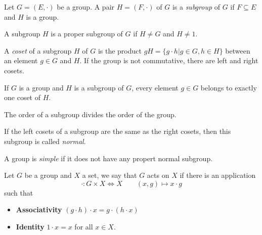 \begin{definition}[Subgroup]
  Let $G = (E, \cdot)$ be a group. A pair $H = (F, \cdot)$ of $G$ is a \textit{subgroup} of $G$ if $F \subseteq E$ and $H$ is a group.
\end{definition}

\begin{definition}
  A subgroup $H$ is a proper subgroup of $G$ if $H \neq G$ and $H \neq {1}$.
\end{definition}

\begin{definition}[Coset]
  A \textit{coset} of a subgroup $H$ of $G$ is the product $gH = \{g \cdot h | g \in G, h \in H\}$ between an element $g \in G$ and $H$. If the group is not commutative, there are left and right cosets.
\end{definition}

\begin{property}
  If $G$ is a group and $H$ is a subgroup of $G$, every element $g \in G$ belongs to exactly one coset of $H$.
\end{property}

\begin{corollary}
  \label{magic-formula}
  The order of a subgroup divides the order of the group.
\end{corollary}

\begin{definition}
  If the left cosets of a subgroup are the same as the right cosets, then this subgroup is called \textit{normal}.
\end{definition}

\begin{definition}
  A group is \textit{simple} if it does not have any propert normal subgroup.
\end{definition}

\begin{definition}[Action]
  Let $G$ be a group and $X$ a set, we say that $G$ acts on $X$ if there is an application
  \[
    \cdot : G \times X \Leftrightarrow X \qquad (x,g) \mapsto x \cdot g
  \]
  such that
  \begin{itemize}
    \item \textbf{Associativity} $(g \cdot h) \cdot x = g \cdot (h \cdot x)$
    \item \textbf{Identity} $ 1 \cdot x = x$ for all $x \in X$.
  \end{itemize}
\end{definition}

